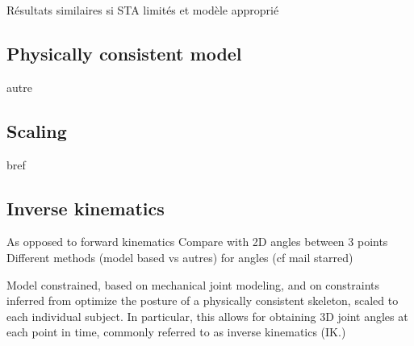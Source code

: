 Résultats similaires si STA limités et modèle approprié \cite{Kainz2016}




\subsection{Physically consistent model}

autre


\subsection{Scaling}

bref


\subsection{Inverse kinematics}



As opposed to forward kinematics \newline
Compare with 2D angles between 3 points \newline
Different methods (model based vs autres) for angles (cf mail starred)\newline


Model constrained, based on mechanical joint modeling, and on constraints inferred from  
optimize the posture of a physically consistent skeleton, scaled to each individual subject. In particular, this allows for obtaining 3D joint angles at each point in time, commonly referred to as inverse kinematics (IK.)








